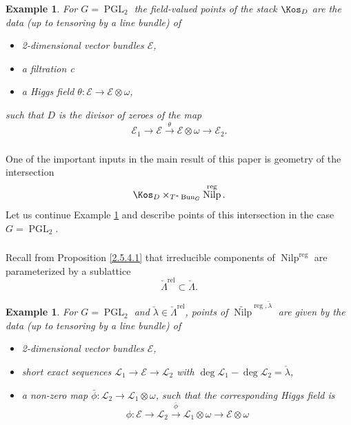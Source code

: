 \documentclass[9pt]{amsart}
\DeclareMathOperator{\reg}{{reg}}
\newcommand{\cE}{{\mathcal E}}
\newcommand{\cL}{{\mathcal L}}
\DeclareMathOperator{\Nilp}{{Nilp}} \DeclareMathOperator{\op}{{op}}
\DeclareMathOperator{\PGL}{{PGL}}
\newtheorem{ex}[subsubsection]{Example}
\numberwithin{equation}{section}
\begin{document}
\begin{ex}\label{kosD SL2}
	For $G = \PGL_2$ the field-valued points of the stack $\Kos_D$ are the data (up to tensoring by a line bundle) of 
	\begin{itemize}
		\item 	2-dimensional vector bundles $\cE$,
		\item a filtration 
		c
		\item a Higgs field $\theta: \cE \rightarrow \cE \otimes \omega$,
	\end{itemize}
	such that $D$ is the divisor of zeroes of the map 
	$$\cE_1 \rightarrow \cE \xrightarrow{\theta} \cE\otimes \omega \rightarrow \cE_2.$$
\end{ex}

\subsubsection{} One of the important inputs in the main result of this paper is geometry of the intersection  $$\Kos_D \times_{T^* \Bun_G} \Nilp^{\reg}.$$ Let us continue Example \ref{kosD SL2} and describe points of this intersection in the case $G = \PGL_2$.
\subsubsection{} Recall from Proposition \ref{2.5.4.1} that irreducible components of $\Nilp^{\reg}$ are parameterized by a sublattice $$\check{\Lambda}^{\operatorname{rel}} \subset  \check{\Lambda}.$$ 

\begin{ex}
For $G = \PGL_2$ and $\check{\lambda} \in \check{\Lambda}^{\operatorname{rel}}$, points of $\widetilde{\Nilp}^{\reg, \check{\lambda}} $ are given by the data (up to tensoring by a line bundle) of
\begin{itemize}
	\item 2-dimensional vector bundles $\cE$,
	\item short exact sequences 
	$\cL_1 \rightarrow \cE \rightarrow \cL_2$ with $\deg \cL_1 - \deg \cL_2 = \check{\lambda}$,
	\item a non-zero map $\bar{\phi}: \cL_2 \rightarrow \cL_1 \otimes \omega$, such that the corresponding Higgs field is 
	$$\phi: \cE \rightarrow \cL_2 \xrightarrow{\bar{\phi}} \cL_1 \otimes \omega \rightarrow \cE \otimes \omega$$
\end{itemize}
\end{ex}
\end{document}
